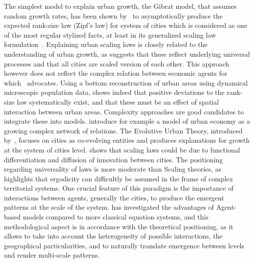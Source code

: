 \documentclass[Royal,sageh,times]{sagej}
\begin{document}
The simplest model to explain urban growth, the Gibrat model, that assumes random growth rates, has been shown by~\cite{gabaix1999zipf} to asymptotically produce the expected rank-size law (Zipf's law) for system of cities which is considered as one of the most regular stylized facts, at least in its generalized scaling law formulation~\citep{nitsch2005zipf}. Explaining urban scaling laws is closely related to the understanding of urban growth, as \cite{bettencourt2008large} suggests that these reflect underlying universal processes and that all cities are scaled version of each other. This approach however does not reflect the complex relation between economic agents for which~\cite{storper2009rethinking} advocates. Using a bottom reconstruction of urban areas using dynamical microscopic population data, \cite{rozenfeld2008laws} shows indeed that positive deviations to the rank-size law systematically exist, and that these must be an effect of spatial interaction between urban areas. Complexity approaches are good candidates to integrate these into models. \cite{andersson2006complex} introduce for example a model of urban economy as a growing complex network of relations. The Evolutive Urban Theory, introduced by~\cite{pumain1997pour}, focuses on cities as co-evolving entities and produces explanations for growth at the system of cities level. \cite{pumain2006evolutionary} shows that scaling laws could be due to functional differentiation and diffusion of innovation between cities. The positioning regarding universality of laws is more moderate than Scaling theories, as \cite{pumain2012urban} highlights that ergodicity can difficultly be assumed in the frame of complex territorial systems. One crucial feature of this paradigm is the importance of interactions between agents, generally the cities, to produce the emergent patterns at the scale of the system. \cite{pumain2013theoretical} has investigated the advantages of Agent-based models compared to more classical equation systems, and this methodological aspect is in accordance with the theoretical positioning, as it allows to take into account the heterogeneity of possible interactions, the geographical particularities, and to naturally translate emergence between levels and render multi-scale patterns.
\end{document}
